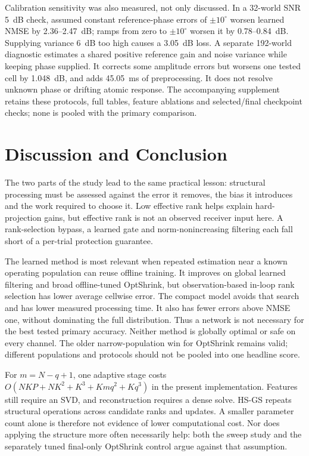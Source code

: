\documentclass[10pt,journal,letterpaper]{IEEEtran}
\begin{document}
Calibration sensitivity was also measured, not only discussed. In a 32-world SNR 5~dB check, assumed constant reference-phase errors of $\pm10^\circ$ worsen learned NMSE by 2.36--2.47~dB; ramps from zero to $\pm10^\circ$ worsen it by 0.78--0.84~dB. Supplying variance 6~dB too high causes a 3.05~dB loss. A separate 192-world diagnostic estimates a shared positive reference gain and noise variance while keeping phase supplied. It corrects some amplitude errors but worsens one tested cell by 1.048~dB, and adds 45.05~ms of preprocessing. It does not resolve unknown phase or drifting atomic response. The accompanying supplement retains these protocols, full tables, feature ablations and selected/final checkpoint checks; none is pooled with the primary comparison.

\section{Discussion and Conclusion}
The two parts of the study lead to the same practical lesson: structural processing must be assessed against the error it removes, the bias it introduces and the work required to choose it. Low effective rank helps explain hard-projection gains, but effective rank is not an observed receiver input here. A rank-selection bypass, a learned gate and norm-nonincreasing filtering each fall short of a per-trial protection guarantee.

The learned method is most relevant when repeated estimation near a known operating population can reuse offline training. It improves on global learned filtering and broad offline-tuned OptShrink, but observation-based in-loop rank selection has lower average cellwise error. The compact model avoids that search and has lower measured processing time. It also has fewer errors above NMSE one, without dominating the full distribution. Thus a network is not necessary for the best tested primary accuracy. Neither method is globally optimal or safe on every channel. The older narrow-population win for OptShrink remains valid; different populations and protocols should not be pooled into one headline score.

For $m=N-q+1$, one adaptive stage costs $O(NKP+NK^2+K^3+Kmq^2+Kq^3)$ in the present implementation. Features still require an SVD, and reconstruction requires a dense solve. HS-GS repeats structural operations across candidate ranks and updates. A smaller parameter count alone is therefore not evidence of lower computational cost. Nor does applying the structure more often necessarily help: both the sweep study and the separately tuned final-only OptShrink control argue against that assumption.
\end{document}
